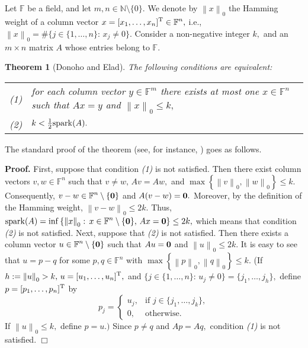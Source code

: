 \documentclass[12pt]{article}
\newtheorem{theorem}{Theorem}
\begin{document}
Let $\mathbb{F}$ be a field, and let $m, n \in \mathbb{N} \setminus \{0\}.$ We denote by $\displaystyle \left\| x \right\|_0$ the Hamming weight of a column vector $\displaystyle x = [x_1, \ldots , x_n]^{\rm T} \in \mathbb{F}^n,$ i.e., $\displaystyle \left\| x \right\|_0 = \# \{j \in \{1, \ldots , n\} :\, x_j \neq 0\}.$ Consider a non-negative integer $k,$ and an $m \times n$ matrix $A$ whose entries belong to $\mathbb{F}.$  
\begin{theorem}[Donoho and Elad]
The following conditions are equivalent:\\
\begin{tabular}{cl}
(1)&for each column vector $\displaystyle y \in \mathbb{F}^m$ there exists at most one $\displaystyle x \in \mathbb{F}^n$ such that $A x = y$ and $\displaystyle \left\| x \right\|_0 \leq k,$\\
(2)&$k < \frac{1}{2} {\rm spark} (A).$\\ 
\end{tabular}
\end{theorem}

The standard proof of the theorem (see, for instance, \cite{ek}) goes as follows.

\noindent
{\bf Proof.} First, suppose that condition {\it (1)} is not satisfied. Then there exist column vectors $\displaystyle v, w \in \mathbb{F}^n$ such that $v \neq w,\, A v = A w,$ and $\displaystyle \max \left\{\left\| v \right\|_0, \left\| w \right\|_0\right\} \leq k.$ Consequently, $\displaystyle v - w \in \mathbb{F}^n \setminus \{{\bf 0}\}$ and $A (v - w) = {\bf 0}.$ Moreover, by the definition of the Hamming weight, $\displaystyle \left\| v - w \right\|_0 \leq 2 k.$ Thus, $\displaystyle {\rm spark} (A) = \inf \left\{\left\| x \right\|_0 :\, x \in \mathbb{F}^n \setminus \{{\bf 0}\},\, A x = {\bf 0}\right\} \leq 2 k,$ which means that condition {\it (2)} is not satisfied. 
\newline
Next, suppose that {\it (2)} is not satisfied. Then there exists a column vector $\displaystyle u \in \mathbb{F}^n \setminus \{{\bf 0}\}$ such that $A u = {\bf 0}$ and $\displaystyle \left\| u \right\|_0 \leq 2 k.$ It is easy to see that $u = p - q$ for some $\displaystyle p, q \in \mathbb{F}^n$ with $\displaystyle \max \left\{\left\| p \right\|_0, \left\| q \right\|_0\right\} \leq k.$ (If $\displaystyle h := \left\| u \right\|_0 > k,\, u = [u_1, \ldots , u_n]^{\rm T},$ and $\displaystyle \{j \in \{1, \ldots , n\} :\, u_j \neq 0\} = \{j_1, \ldots , j_h\},$ define $\displaystyle p = [p_1, \ldots , p_n]^{\rm T}$ by
$$
p_j = \left\{
\begin{array}{ll}
u_j,&\mbox{if $j \in \{j_1, \ldots , j_k\},$}\\
0,&\mbox{otherwise.} 
\end{array}
\right.
$$
If $\displaystyle \left\| u \right\|_0 \leq k,$ define $p = u.)$ Since $p \neq q$ and $A p = A q,$ condition {\it (1)} is not satisfied. $\Box$   
\end{document}
